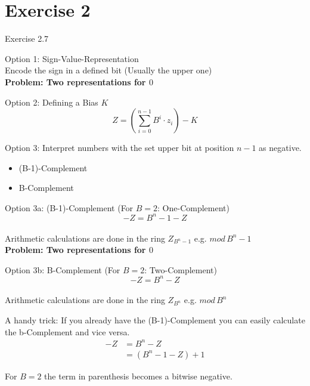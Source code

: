 \documentclass[11pt]{tudbeamer}
\begin{document}
\section{Exercise 2}
\begin{frame}[allowframebreaks]{Exercise 2.7}

	Option 1: Sign-Value-Representation \\
	Encode the sign in a defined bit (Usually the upper one)\\
	\textbf{Problem: Two representations for $0$}
	
\framebreak

	Option 2: Defining a Bias $K$ \\
	$$Z = \left( \sum_{i=0}^{n-1} B^i \cdot z_i \right) - K$$
	
\framebreak

	Option 3: Interpret numbers with the set upper bit at position $n-1$ as negative. \\
	\begin{itemize}
		\item (B-1)-Complement
		\item B-Complement
	\end{itemize}

\framebreak

	Option 3a: (B-1)-Complement (For $B=2$: One-Complement)\\
	$$-Z = B^n-1-Z$$ \\
	Arithmetic calculations are done in the ring $Z_{B^n - 1}$ e.g. $mod \, B^n - 1$ \\
	\textbf{Problem: Two representations for $0$}
	
\framebreak

	Option 3b: B-Complement (For $B=2$: Two-Complement) \\
	$$-Z = B^n-Z$$ \\
	Arithmetic calculations are done in the ring $Z_{B^n}$ e.g. $mod \, B^n$
	
\framebreak

	A handy trick: If you already have the (B-1)-Complement you can easily calculate the b-Complement and vice versa. \\

	\begin{align}
	-Z &= B^n - Z \\
	&= (B^n-1-Z) + 1
	\end{align}
	
	For $B=2$ the term in parenthesis becomes a bitwise negative.	

\end{frame}
\end{document}
